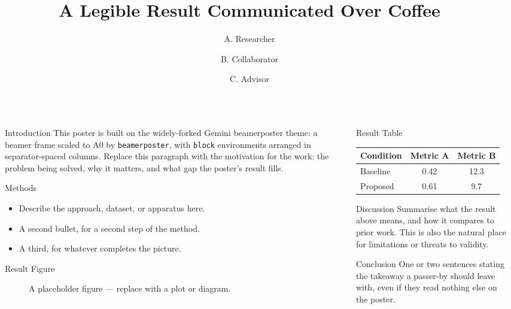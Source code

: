 \documentclass[final]{beamer}
\title{A Legible Result Communicated Over Coffee}
\author{A. Researcher \inst{1} \and B. Collaborator \inst{2} \and C. Advisor \inst{1}}
\institute[shortinst]{\inst{1} Department of Computational Something \samelineand \inst{2} University of Somewhere}
\newlength{\sepwidth}
\newlength{\colwidth}
\newcommand{\separatorcolumn}{\begin{column}{\sepwidth}\end{column}}
\begin{document}
\begin{frame}[t]
\begin{columns}[t]
\separatorcolumn

\begin{column}{\colwidth}
	\begin{block}{Introduction}
		This poster is built on the widely-forked Gemini beamerposter
		theme: a beamer frame scaled to A0 by \texttt{beamerposter}, with
		\texttt{block} environments arranged in separator-spaced columns.
		Replace this paragraph with the motivation for the work: the
		problem being solved, why it matters, and what gap the poster's
		result fills.
	\end{block}
	\begin{block}{Methods}
		\begin{itemize}
			\item Describe the approach, dataset, or apparatus here.
			\item A second bullet, for a second step of the method.
			\item A third, for whatever completes the picture.
		\end{itemize}
	\end{block}
	\begin{block}{Result Figure}
		\begin{figure}
			\centering
			\caption{A placeholder figure — replace with a plot or diagram.}
		\end{figure}
	\end{block}
\end{column}

\separatorcolumn

\begin{column}{\colwidth}
	\begin{block}{Result Table}
		\centering
		\begin{tabular}{lcc}
			\toprule
			Condition & Metric A & Metric B \\
			\midrule
			Baseline  & 0.42     & 12.3     \\
			Proposed  & 0.61     & 9.7      \\
			\bottomrule
		\end{tabular}
	\end{block}
	\begin{exampleblock}{Discussion}
		Summarise what the result above means, and how it compares to
		prior work. This is also the natural place for limitations or
		threats to validity.
	\end{exampleblock}
	\begin{block}{Conclusion}
		One or two sentences stating the takeaway a passer-by should
		leave with, even if they read nothing else on the poster.
	\end{block}
\end{column}


\end{columns}
\end{frame}
\end{document}

